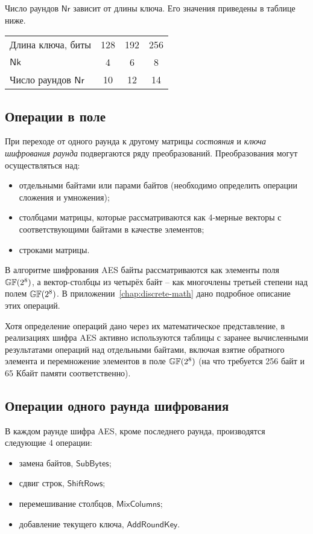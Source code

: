 Число раундов $\mathsf{Nr}$ зависит от длины ключа. Его значения приведены в таблице ниже.

\begin{center}
    \begin{tabular}{|l|c|c|c|}
    \hline
    Длина ключа, биты           &128 & 192 & 256 \\
    $\mathsf{Nk}$               & 4  & 6   & 8 \\
    Число раундов $\mathsf{Nr}$ & 10 & 12 & 14 \\
    \hline
    \end{tabular}
\end{center}


\subsection{Операции в поле}

При переходе от одного раунда к другому матрицы \emph{состояния} и \emph{ключа шифрования раунда} подвергаются ряду преобразований. Преобразования могут осуществляться над:
\begin{itemize}
    \item отдельными байтами или парами байтов (необходимо определить операции сложения и умножения);
    \item столбцами матрицы, которые рассматриваются как 4-мерные векторы с соответствующими байтами в качестве элементов;
    \item строками матрицы.
\end{itemize}

В алгоритме шифрования AES байты рассматриваются как элементы поля $\mathbb{GF}(2^8)$, а вектор-столбцы из четырёх байт -- как многочлены третьей степени над полем $\mathbb{GF}(2^8)$. В приложении~\ref{chap:discrete-math} дано подробное описание этих операций.

Хотя определение операций дано через их математическое представление, в реализациях шифра AES активно используются таблицы с заранее вычисленными результатами операций над отдельными байтами, включая взятие обратного элемента и перемножение элементов в поле $\mathbb{GF}(2^8)$ (на что требуется 256 байт и 65 Кбайт памяти соответственно).

\subsection{Операции одного раунда шифрования}

В каждом раунде шифра AES, кроме последнего раунда, производятся следующие 4 операции:
\begin{itemize}
  \item замена байтов, $\mathsf{SubBytes}$;
  \item сдвиг строк, $\mathsf{ShiftRows}$;
  \item перемешивание столбцов, $\mathsf{MixColumns}$;
  \item добавление текущего ключа, $\mathsf{AddRoundKey}$.
\end{itemize}

